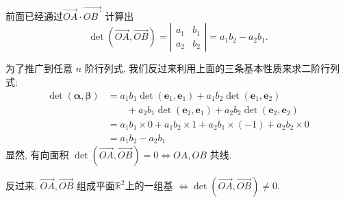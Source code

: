 \documentclass[10pt,punct]{ctexbeamer}
\begin{document}
\begin{frame}
    前面已经通过$\overrightarrow{O A} \cdot \overrightarrow{O B^{\, \prime}}$ 计算出
    $$\operatorname{det}(\overrightarrow{O A}, \overrightarrow{O B})=\left|\begin{array}{ll}a_1 & b_1 \\ a_2 & b_2\end{array}\right|=a_1 b_2-a_2 b_1.$$


    为了推广到任意 $n$ 阶行列式, 我们反过来利用上面的三条基本性质来求二阶行列式:
        $$\begin{aligned}    \operatorname{det}(\boldsymbol{\alpha}, \boldsymbol{\beta})
            & = a_1 b_1 \operatorname{det}\left(\boldsymbol{e}_1, \boldsymbol{e}_1\right)
            +a_1 b_2 \operatorname{det}\left(\boldsymbol{e}_1, \boldsymbol{e}_2\right)\\
            & \qquad
            +a_2 b_1 \operatorname{det}\left(\boldsymbol{e}_2, \boldsymbol{e}_1\right)
            +a_2 b_2 \operatorname{det}\left(\boldsymbol{e}_2, \boldsymbol{e}_2\right) \\
            & = a_1 b_1 \times 0+a_1 b_2 \times 1+a_2 b_1 \times(-1)+a_2 b_2 \times 0 \\ &=a_1 b_2-a_2 b_1 \end{aligned}$$
        显然, 有向面积 $\operatorname{det}(\overrightarrow{O A}, \overrightarrow{O B})=0 \Leftrightarrow O A, O B$ 共线.


        反过来, $\overrightarrow{O A}, \overrightarrow{O B}$ 组成平面$\mathbb{R}^2$上的一组基 $\Leftrightarrow \operatorname{det}(\overrightarrow{O A}, \overrightarrow{O B}) \neq 0$.

    \end{frame}
\end{document}
